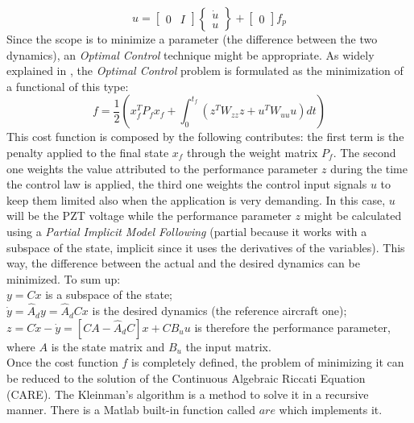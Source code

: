 \documentclass[twocolumn,a4paper,10pt,english]{article}
\begin{document}
	\[
	u=
	\begin{bmatrix}
	0 & I
	\end{bmatrix}
	\begin{Bmatrix}
	\dot{u} \\
	u
	\end{Bmatrix}+
	\begin{bmatrix} 
	0
	\end{bmatrix}
	f_p
	\]
Since the scope is to minimize a parameter (the difference between the two dynamics), an \textit{Optimal Control} technique might be appropriate. As widely explained in \cite{c3}, the \textit{Optimal Control} problem is formulated as the minimization of a functional of this type:
\begin{equation}
f=\frac{1}{2}(x_f^TP_fx_f+\int_0^{t_f}(z^TW_{zz}z+u^TW_{uu}u)dt)
\end{equation}
This cost function is composed by the following contributes: the first term is the penalty applied to the final state $x_f$ through the weight matrix $P_f$. The second one weights the value attributed to the performance parameter $z$ during the time the control law is applied, the third one weights the control input signals $u$ to keep them limited also when the application is very demanding.
In this case, $u$ will be the PZT voltage while the performance parameter $z$ might be calculated using a \textit{Partial Implicit Model Following} (partial because it works with a subspace of the state, implicit since it uses the derivatives of the variables). This way, the difference between the actual and the desired dynamics can be minimized.
To sum up:\\
$y=Cx$ is a subspace of the state;\\
$\dot{y}=\hat{A}_dy=\hat{A}_dCx$ is the desired dynamics (the reference aircraft one);\\
$z=C\dot{x}-\dot{y}=[CA-\hat{A}_dC]x+CB_uu$ is therefore the performance parameter, where $A$ is the state matrix and $B_u$ the input matrix.\\
Once the cost function $f$ is completely defined, the problem of minimizing it can be reduced to the solution of the Continuous Algebraic Riccati Equation (CARE). The Kleinman's algorithm \cite{c4} is a method to solve it in a recursive manner. There is a Matlab built-in function called $are$ which implements it.


    
    
        
\end{document}
